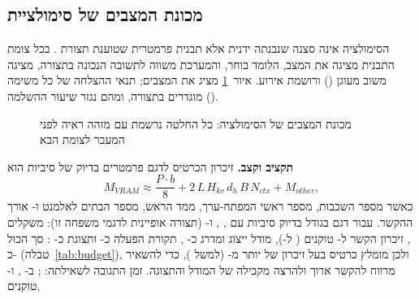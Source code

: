 \subsection{מכונת המצבים של סימולציית }
הסימולציה אינה סצנה שנבנתה ידנית אלא תבנית פרמטרית שטוענת תצורת \texttt{}. בכל צומת התבנית מציגה את המצב, הלומד בוחר, והמערכת
משווה לתשובה הנכונה בתצורה, מציגה משוב מעוגן (\texttt{}) ורושמת אירוע. איור~\ref{fig:sim} מציג את המצבים; תנאי ההצלחה של כל משימה
מוגדרים בתצורה, ומהם נגזר שיעור ההשלמה ().
\begin{figure}[!htbp]
\centering
{}
\caption{מכונת המצבים של הסימולציה: כל החלטה נרשמת עם מזהה ראיה לפני המעבר לצומת הבא}\label{fig:sim}
\end{figure}
\textbf{תקציב  וקצב.} זיכרון הכרטיס לדגם  פרמטרים בדיוק של  סיביות הוא
\begin{equation}
  M_{VRAM}\approx \frac{P\cdot b}{8}+2\,L\,H_{kv}\,d_h\,B\,N_{ctx}+M_{other},
\end{equation}
כאשר  מספר השכבות,  מספר ראשי המפתח-ערך,  ממד הראש,  מספר הבתים לאלמנט ו- אורך ההקשר. עבור דגם
בגודל  בדיוק  סיביות עם , ,  ו- (תצורה אופיינית לדגמי משפחה זו):
משקלים  , זיכרון הקשר   ל- טוקנים (  ל-),
מודל ייצוג ומדרג כ- , תקורת הפעלה כ-  ותצוגת  כ- : סך הכול
כ-  (טבלה~\ref{tab:budget}), ולכן מומלץ כרטיס בעל זיכרון של יותר מ-  (למשל  ), כדי להשאיר מרווח להקשר ארוך ולהרצה מקבילה של המודל והתצוגה.
זמן התגובה לשאילתה: ; ב- ,   ו- טוקנים,

